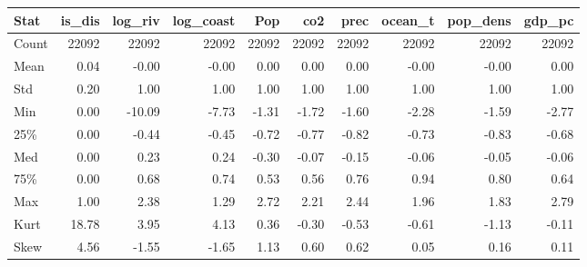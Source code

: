 \begin{table}[htbp]
\centering
{}
\label{tab:geo_sum_ca}
\footnotesize
\setlength{\tabcolsep}{4pt}
\renewcommand{\arraystretch}{0.9}
\begin{tabular}{lrrrrrrrrr}
\toprule
\textbf{Stat} & \textbf{is\_dis} & \textbf{log\_riv} & \textbf{log\_coast} & \textbf{Pop} & \textbf{co2} & \textbf{prec} & \textbf{ocean\_t} & \textbf{pop\_dens} & \textbf{gdp\_pc} \\
\midrule
Count & 22092 & 22092 & 22092 & 22092 & 22092 & 22092 & 22092 & 22092 & 22092 \\
Mean & 0.04 & -0.00 & -0.00 & 0.00 & 0.00 & 0.00 & -0.00 & -0.00 & 0.00 \\
Std & 0.20 & 1.00 & 1.00 & 1.00 & 1.00 & 1.00 & 1.00 & 1.00 & 1.00 \\
Min & 0.00 & -10.09 & -7.73 & -1.31 & -1.72 & -1.60 & -2.28 & -1.59 & -2.77 \\
25\% & 0.00 & -0.44 & -0.45 & -0.72 & -0.77 & -0.82 & -0.73 & -0.83 & -0.68 \\
Med & 0.00 & 0.23 & 0.24 & -0.30 & -0.07 & -0.15 & -0.06 & -0.05 & -0.06 \\
75\% & 0.00 & 0.68 & 0.74 & 0.53 & 0.56 & 0.76 & 0.94 & 0.80 & 0.64 \\
Max & 1.00 & 2.38 & 1.29 & 2.72 & 2.21 & 2.44 & 1.96 & 1.83 & 2.79 \\
Kurt & 18.78 & 3.95 & 4.13 & 0.36 & -0.30 & -0.53 & -0.61 & -1.13 & -0.11 \\
Skew & 4.56 & -1.55 & -1.65 & 1.13 & 0.60 & 0.62 & 0.05 & 0.16 & 0.11 \\
\bottomrule
\end{tabular}
\end{table}
